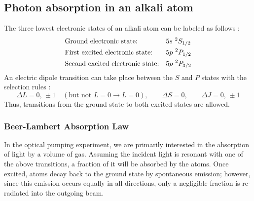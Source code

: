 \subsection{Photon absorption in an alkali atom}

The three lowest electronic states of an alkali atom can be labeled as follows :
\begin{align}
    &\text{Ground electronic state:}         && 5s\ ^2S_{1/2} \notag \\
    &\text{First excited electronic state:}  && 5p\ ^2P_{1/2} \notag \\
    &\text{Second excited electronic state:} && 5p\ ^2P_{3/2} \notag
\end{align}
An electric dipole transition can take place between the $S$ and $P$ states with the
selection rules :
\begin{equation}
    \Delta L = 0,\,\pm 1 \quad (\text{but not } L=0 \to L=0),
    \qquad \Delta S = 0,
    \qquad \Delta J = 0,\,\pm 1
    \label{eq:dipole_selection}
\end{equation}
Thus, transitions from the ground state to both excited states are allowed.
 
\subsubsection*{Beer-Lambert Absorption Law}
 
In the optical pumping experiment, we are primarily interested in the absorption of light
by a volume of gas. Assuming the incident light is resonant with one of the above
transitions, a fraction of it will be absorbed by the atoms. Once excited, atoms decay back
to the ground state by spontaneous emission; however, since this emission occurs equally in
all directions, only a negligible fraction is re-radiated into the outgoing beam.
 
